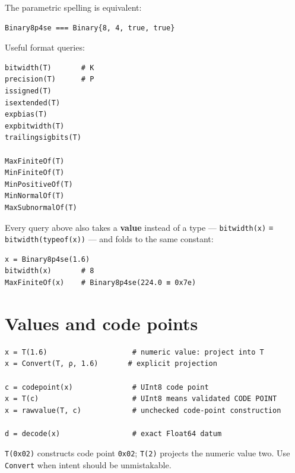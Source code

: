 The parametric spelling is equivalent:




\begin{verbatim}
Binary8p4se === Binary{8, 4, true, true}
\end{verbatim}



Useful format queries:




\begin{verbatim}
bitwidth(T)       # K
precision(T)      # P
issigned(T)
isextended(T)
expbias(T)
expbitwidth(T)
trailingsigbits(T)

MaxFiniteOf(T)
MinFiniteOf(T)
MinPositiveOf(T)
MinNormalOf(T)
MaxSubnormalOf(T)
\end{verbatim}



Every query above also takes a \textbf{value} instead of a type — \texttt{bitwidth(x)} ≡ \texttt{bitwidth(typeof(x))} — and folds to the same constant:




\begin{verbatim}
x = Binary8p4se(1.6)
bitwidth(x)       # 8
MaxFiniteOf(x)    # Binary8p4se(224.0 ≡ 0x7e)
\end{verbatim}



\section{Values and code points}



\label{1762024146591479678}{}



\begin{verbatim}
x = T(1.6)                    # numeric value: project into T
x = Convert(T, ρ, 1.6)       # explicit projection

c = codepoint(x)              # UInt8 code point
x = T(c)                      # UInt8 means validated CODE POINT
x = rawvalue(T, c)            # unchecked code-point construction

d = decode(x)                 # exact Float64 datum
\end{verbatim}



\begin{tcolorbox}[toptitle=-1mm,bottomtitle=1mm,colback=admonition-warning!50!white,colframe=admonition-warning,title=\textbf{`UInt8` means code point}]
\texttt{T(0x02)} constructs code point \texttt{0x02}; \texttt{T(2)} projects the numeric value two. Use \texttt{Convert} when intent should be unmistakable.

\end{tcolorbox}


